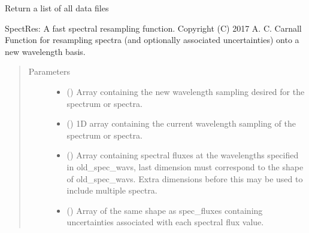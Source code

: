 \documentclass[a4paper,11pt,english]{sphinxmanual}
\begin{document}

\begin{fulllineitems}
\label{\detokenize{cascade.utilities:cascade.utilities.utilities.find}}
Return  a list of all data files

\end{fulllineitems}


\begin{fulllineitems}
\label{\detokenize{cascade.utilities:cascade.utilities.utilities.spectres}}
SpectRes: A fast spectral resampling function.
Copyright (C) 2017  A. C. Carnall
Function for resampling spectra (and optionally associated uncertainties)
onto a new wavelength basis.
\begin{quote}\begin{description}
\item[{Parameters}] \leavevmode\begin{itemize}
\item {} 
 () \textendash{} Array containing the new wavelength sampling desired for the spectrum
or spectra.

\item {} 
 () \textendash{} 1D array containing the current wavelength sampling of the spectrum or
spectra.

\item {} 
 () \textendash{} Array containing spectral fluxes at the wavelengths specified in
old\_spec\_wavs, last dimension must correspond to the shape of
old\_spec\_wavs.
Extra dimensions before this may be used to include multiple spectra.

\item {} 
 (\sphinxstyleliteralemphasis{\sphinxupquote{ (}}\sphinxstyleliteralemphasis{\sphinxupquote{)}}) \textendash{} Array of the same shape as spec\_fluxes containing uncertainties
associated with each spectral flux value.


\end{itemize}
\end{description}
\end{quote}
\end{fulllineitems}
\end{document}
